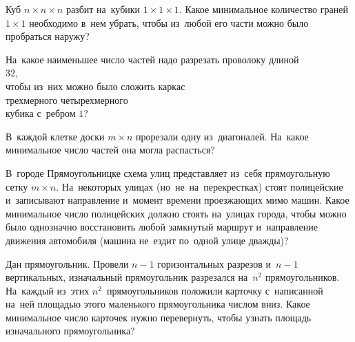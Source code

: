 


\begin{problems}

\item
Куб $n \times n \times n$ разбит на~кубики $1 \times 1 \times 1$.
Какое минимальное количество граней $1 \times 1$ необходимо в~нем убрать, чтобы
из~любой его части можно было пробраться наружу?

\item
На~какое наименьшее число частей надо разрезать проволоку длиной
\\
 \hphantom{трехмерного}
\qquad
{} $32$,
\\
чтобы из~них можно было сложить каркас
\\
 трехмерного
\qquad
{} четырехмерного
\\
кубика с~ребром $1$?
\begin{center}
\qquad
\end{center}


\item
В~каждой клетке доски $m \times n$ прорезали одну из~диагоналей.
На~какое минимальное число частей она могла распасться?

\item
В~городе Прямоугольницке схема улиц представляет из~себя прямоугольную сетку
$m \times n$.
На~некоторых улицах (но~не~на~перекрестках) стоят полицейские и~записывают
направление и~момент времени проезжающих мимо машин.
Какое минимальное число полицейских должно стоять на~улицах города, чтобы можно
было однозначно восстановить любой замкнутый маршрут и~направление движения
автомобиля (машина не~ездит по~одной улице дважды)?

\item
Дан прямоугольник.
Провели $n - 1$ горизонтальных разрезов и~$n - 1$ вертикальных, изначальный
прямоугольник разрезался на~$n^2$ прямоугольников.
На~каждый из~этих $n^2$~прямоугольников положили карточку с~написанной на~ней
площадью этого маленького прямоугольника числом вниз.
Какое минимальное число карточек нужно перевернуть, чтобы узнать площадь
изначального прямоугольника?


\end{problems}
